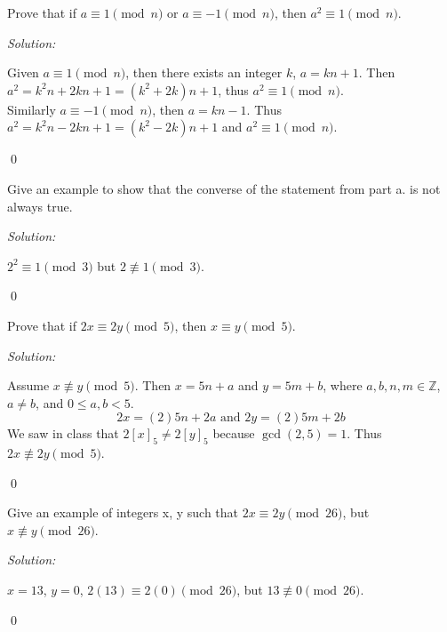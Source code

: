 \documentclass[12 pt]{article}
\newenvironment{problem}[2][Problem]{\begin{trivlist}
\item[\hskip \labelsep {\bfseries #1}\hskip \labelsep {\bfseries #2.}]}{\end{trivlist}}
\newenvironment{sol}
    {\emph{Solution:}
    }
    {
    \qed
    }
\theoremstyle{definition}
\newcommand{\Z}{\mathbb{Z}} %
\begin{document}
\begin{problem}{1a}
Prove that if $a \equiv 1 \pmod n$ or $a \equiv -1 \pmod n$, then $a^2 \equiv 1 \pmod n$.
\end{problem}
\begin{sol}
Given $a \equiv 1 \pmod n$, then there exists an integer $k$, $a = kn + 1$. Then $a^2 = k^2n + 2kn + 1 = (k^2+2k)n + 1$, thus $a^2\equiv 1 \pmod n$.\\Similarly $a \equiv -1\pmod n$, then $a = kn - 1$. Thus $a^2 = k^2n-2kn+1 = (k^2 - 2k)n + 1$ and $a^2 \equiv 1 \pmod n$. 
\end{sol}
\begin{problem}{1b}
Give an example to show that the converse of the statement from
part a. is not always true.
\end{problem}
\begin{sol}
$2^2 \equiv 1 \pmod 3$ but $2 \not\equiv 1 \pmod 3$.
\end{sol}

\begin{problem}{2a}
Prove that if $2x \equiv 2y \pmod5$, then $x\equiv y \pmod 5$.
\end{problem}
\begin{sol}
Assume $x\not\equiv y \pmod 5$. Then $x = 5n + a$ and $y = 5m + b$, where $a,b,n,m\in \Z$, $a\not=b$, and $0 \leq a,b < 5$.
\[2x = (2)5n + 2a \text{ and } 2y = (2)5m + 2b\]
We saw in class that $2[x]_5 \neq 2[y]_5$ because $\gcd(2,5) = 1$. Thus $2x \not\equiv 2y \pmod 5$. 

\end{sol}
\begin{problem}{2b}Give an example of integers x, y such that $2x \equiv 2y \pmod{26}$, but
$x \not\equiv y \pmod 26$.
\end{problem}
\begin{sol}
$x = 13$, $y=0$, $2(13) \equiv 2(0) \pmod {26}$, but $13 \not \equiv 0 \pmod{26}$.
\end{sol}
\end{document}
